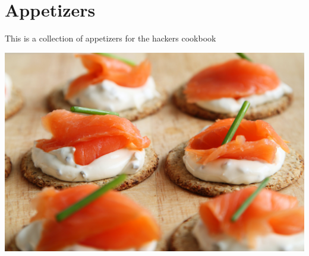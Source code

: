 \chapter{Appetizers}

This is a collection of appetizers for the hackers cookbook

\centering
\includegraphics{images/appetizer-canape-canapes-cheese-41967.jpg}
